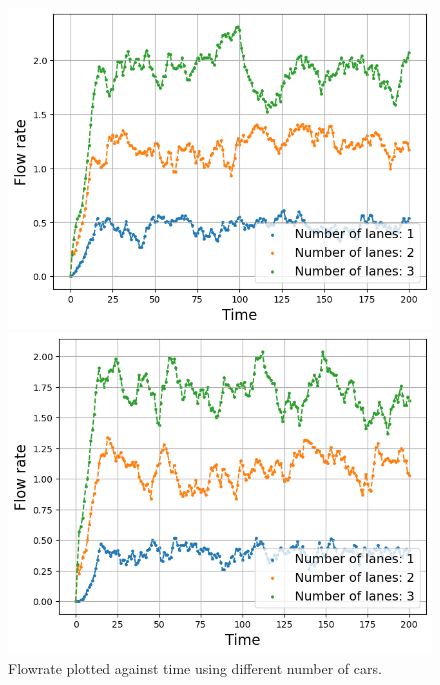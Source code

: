 \documentclass[a4paper,12pt]{article}
\begin{document}
\begin{figure}[H]
\begin{minipage}{.5\textwidth}
    \end{minipage}
    \centering
    \begin{minipage}{.5\textwidth}
        \centering
        \includegraphics[scale=0.47]{Images/flowrate time 30 cars.png}
    \end{minipage}%
    \begin{minipage}{.5\textwidth}
        \centering
        \includegraphics[scale=0.47]{Images/flowrate time 40 cars.png}
    \end{minipage}
    \caption{Flowrate plotted against time using different number of cars.}
    \label{flowrate}
\end{figure}
\end{document}
